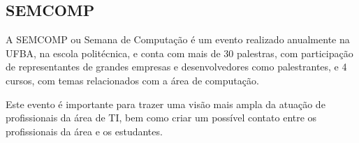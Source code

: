         
    \subsection{SEMCOMP}
        \par A SEMCOMP ou Semana de Computação é um evento realizado anualmente na UFBA, na escola politécnica, e conta com mais de 30 palestras, com participação de representantes de grandes empresas e desenvolvedores como palestrantes, e 4 cursos, com temas relacionados com a área de computação. \par Este evento é importante para trazer uma visão mais ampla da atuação de profissionais da área de TI, bem como criar um possível contato entre os profissionais da área e os estudantes.